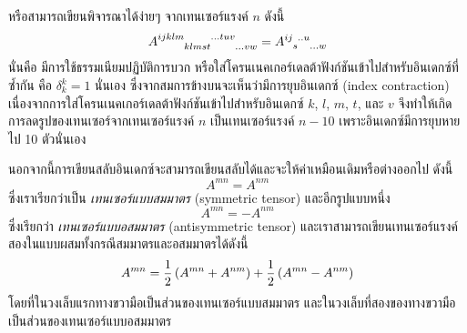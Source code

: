 หรือสามารถเขียนพิจารณาได้ง่ายๆ จากเทนเซอร์แรงค์ $n$ ดังนี้
\begin{equation}\label{ContractionTensorRn}
\tensor{A}{^{ijklm}_{klmst}^{...tuv}_{...vw}} = \tensor{A}{^{ij}_{s}^{..u}_{...w}}
\end{equation}
นั่นคือ มีการใช้ธรรมเนียมปฏิบัติการบวก หรือใส่โครนเนคเกอร์เดลต้าฟังก์ชันเข้าไปสำหรับอินเดกซ์ที่ซ้ำกัน คือ $\delta^k_k = 1$ นั่นเอง ซึ่งจากสมการข้างบนจะเห็นว่ามีการยุบอินเดกซ์ (index contraction) เนื่องจากการใส่โครนเนคเกอร์เดลต้าฟังก์ชันเข้าไปสำหรับอินเดกซ์ $k$, $l$, $m$, $t$, และ $v$ จึงทำให้เกิดการลดรูปของเทนเซอร์จากเทนเซอร์แรงค์ $n$ เป็นเทนเซอร์แรงค์ $n - 10$ เพราะอินเดกซ์มีการยุบหายไป 10 ตัวนั่นเอง

นอกจากนี้การเขียนสลับอินเดกซ์จะสามารถเขียนสลับได้และจะให้ค่าเหมือนเดิมหรือต่างออกไป ดังนี้
\begin{equation}\label{SymmetryTensor}
A^{mn} = A^{nm}
\end{equation}
ซึ่งเราเรียกว่าเป็น \emph{เทนเซอร์แบบสมมาตร} (symmetric tensor) และอีกรูปแบบหนึ่ง
\begin{equation}\label{AntisymmetryTensor}
A^{mn} = - A^{nm}
\end{equation}
ซึ่งเรียกว่า \emph{เทนเซอร์แบบอสมมาตร} (antisymmetric tensor) และเราสามารถเขียนเทนเซอร์แรงค์สองในแบบผสมทั้งกรณีสมมาตรและอสมมาตรได้ดังนี้
\begin{equation}\label{MixedSymTensor}
A^{mn} = \frac{1}{2}\left(A^{mn} + A^{nm}\right) + \frac{1}{2}\left(A^{mn} - A^{nm}\right)
\end{equation}
โดยที่ในวงเล็บแรกทางขวามือเป็นส่วนของเทนเซอร์แบบสมมาตร และในวงเล็บที่สองของทางขวามือเป็นส่วนของเทนเซอร์แบบอสมมาตร
